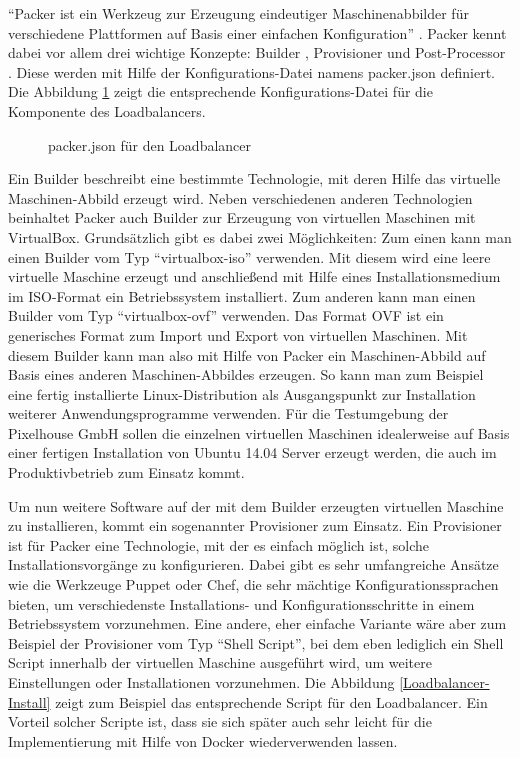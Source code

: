 "`Packer ist ein Werkzeug zur Erzeugung eindeutiger Maschinenabbilder für verschiedene Plattformen auf Basis einer einfachen Konfiguration"' \citep[Siehe][]{Packer15}. Packer kennt dabei vor allem drei wichtige Konzepte: Builder \citep[Vgl.][]{Packer:001}, Provisioner \citep[Vgl.][]{Packer:002} und Post-Processor \citep[Vgl.][]{Packer:003}. Diese werden mit Hilfe der Konfigurations-Datei namens packer.json definiert. Die Abbildung \ref{Loadbalancer-Packer} zeigt die entsprechende Konfigurations-Datei für die Komponente des Loadbalancers.

\begin{figure}[!ht]
  \begin{center}
    \caption{packer.json für den Loadbalancer}
    \label{Loadbalancer-Packer}
  \end{center}
\end{figure}

Ein Builder \citep[Vgl.][]{Packer:001} beschreibt eine bestimmte Technologie, mit deren Hilfe das virtuelle Maschinen-Abbild erzeugt wird. Neben verschiedenen anderen Technologien beinhaltet Packer auch Builder zur Erzeugung von virtuellen Maschinen mit VirtualBox. Grundsätzlich gibt es dabei zwei Möglichkeiten: Zum einen kann man einen Builder vom Typ "`virtualbox-iso"' verwenden. Mit diesem wird eine leere virtuelle Maschine erzeugt und anschließend mit Hilfe eines Installationsmedium im ISO-Format ein Betriebssystem installiert. Zum anderen kann man einen Builder vom Typ "`virtualbox-ovf"' verwenden. Das Format OVF ist ein generisches Format zum Import und Export von virtuellen Maschinen. Mit diesem Builder kann man also mit Hilfe von Packer ein Maschinen-Abbild auf Basis eines anderen Maschinen-Abbildes erzeugen. So kann man zum Beispiel eine fertig installierte Linux-Distribution als Ausgangspunkt zur Installation weiterer Anwendungsprogramme verwenden. Für die Testumgebung der Pixelhouse GmbH sollen die einzelnen virtuellen Maschinen idealerweise auf Basis einer fertigen Installation von Ubuntu 14.04 Server erzeugt werden, die auch im Produktivbetrieb zum Einsatz kommt.

Um nun weitere Software auf der mit dem Builder erzeugten virtuellen Maschine zu installieren, kommt ein sogenannter Provisioner \citep[Vgl.][]{Packer:002} zum Einsatz. Ein Provisioner ist für Packer eine Technologie, mit der es einfach möglich ist, solche Installationsvorgänge zu konfigurieren. Dabei gibt es sehr umfangreiche Ansätze wie die Werkzeuge Puppet oder Chef, die sehr mächtige Konfigurationssprachen bieten, um verschiedenste Installations- und Konfigurationsschritte in einem Betriebssystem vorzunehmen. Eine andere, eher einfache Variante wäre aber zum Beispiel der Provisioner vom Typ "`Shell Script"', bei dem eben lediglich ein Shell Script innerhalb der virtuellen Maschine ausgeführt wird, um weitere Einstellungen oder Installationen vorzunehmen. Die Abbildung \ref{Loadbalancer-Install} zeigt zum Beispiel das entsprechende Script für den Loadbalancer. Ein Vorteil solcher Scripte ist, dass sie sich später auch sehr leicht für die Implementierung mit Hilfe von Docker wiederverwenden lassen.

